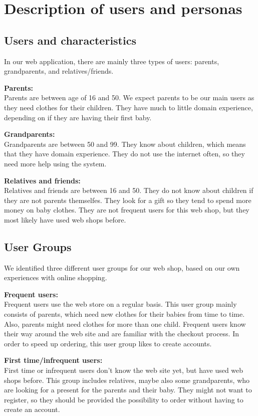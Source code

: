 \section{Description of users and personas}
\subsection{Users and characteristics}

In our web application, there are mainly three types of users: parents,  grandparents, and relatives/friends.

\noindent\textbf{Parents:}\\
Parents are between age of 16 and 50. We expect parents to be our main users as they need clothes for their children. They have much to little domain experience, depending on if they are having their first baby.

\noindent\textbf{Grandparents:}\\
Grandparents are between 50 and 99. They know about children, which means that they have domain experience. They do not use the internet often, so they need more help using the system.
 
\noindent\textbf{Relatives and friends:}\\
Relatives and friends are between 16 and 50. They do not know about children if they are not parents themselfes. They look for a gift so they tend to spend more money on baby clothes. They are not frequent users for this web shop, but they most likely have used web shops before.

\subsection{User Groups}
We identified three different user groups for our web shop, based on our own experiences with online shopping.
 
\noindent\textbf{Frequent users:}\\
Frequent users use the web store on a regular basis. This user group mainly consists of parents, which need new clothes for their babies from time to time. Also, parents might need clothes for more than one child. Frequent users know their way around the web site and are familiar with the checkout process. In order to speed up ordering, this user group likes to create accounts. 

\noindent\textbf{First time/infrequent users:}\\
First time or infrequent users don't know the web site yet, but have used web shops before. This group includes relatives, maybe also some grandparents, who are looking for a present for the parents and their baby. They might not want to register, so they should be provided the possibility to order without having to create an account.
 
